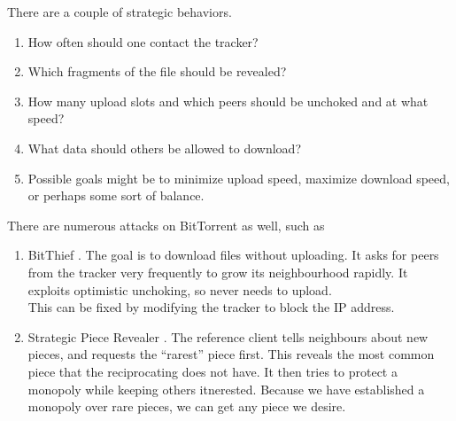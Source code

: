 		There are a couple of strategic behaviors.
		\begin{enumerate}
			\item How often should one contact the tracker?
			\item Which fragments of the file should be revealed?
			\item How many upload slots and which peers should be unchoked and at what speed?
			\item What data should others be allowed to download?
			\item Possible goals might be to minimize upload speed, maximize download speed, or perhaps some sort of balance.
		\end{enumerate}

		There are numerous attacks on BitTorrent as well, such as
		\begin{enumerate}
			\item BitThief \cite{bitthief}. The goal is to download files without uploading. It asks for peers from the tracker very frequently to grow its neighbourhood rapidly. It exploits optimistic unchoking, so never needs to upload.\\
			This can be fixed by modifying the tracker to block the IP address.
			\item Strategic Piece Revealer \cite{strategic-piece-revealer}. The reference client tells neighbours about new pieces, and requests the ``rarest'' piece first. This reveals the most common piece that the reciprocating does not have. It then tries to protect a monopoly while keeping others itnerested. Because we have established a monopoly over rare pieces, we can get any piece we desire. %
		\end{enumerate}
